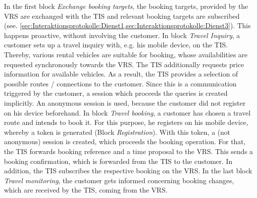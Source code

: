 In the first block \textit{Exchange booking targets}, the booking targets, provided by the VRS are exchanged with the TIS and relevant booking targets are subscribed (see. \cref{sec:Interaktionsprotokolle:Dienst1,sec:Interaktionsprotokolle:Dienst3}). This happens proactive, without involving the customer.
In block \textit{Travel Inquiry}, a customer sets up a travel inquiry with, e.g. his mobile device, on the TIS. Thereby, various rental vehicles are suitable for booking, whose availabilities are requested synchronously towards the VRS. The TIS additionally requests price information for available vehicles. As a result, the TIS provides a selection of possible routes / connections to the customer. Since this is a communication triggered by the customer, a session which proceeds the queries is created implicitly. An anonymous session is used, because the customer did not register on his device beforehand.
In block \textit{Travel booking}, a customer has chosen a travel route and intends to book it. For this purpose, he registers on his mobile device, whereby a token is generated (Block \emph{Registration}). With this token, a (not anonymous) session is created, which proceeds the booking operation. For that, the TIS forwards booking reference and a time proposal to the VRS. This sends a booking confirmation, which is forwarded from the TIS to the customer. In addition, the TIS subscribes the respective booking on the VRS.
In the last block \textit{Travel monitoring}, the customer gets informed concerning booking changes, which are received by the TIS, coming from the VRS.

